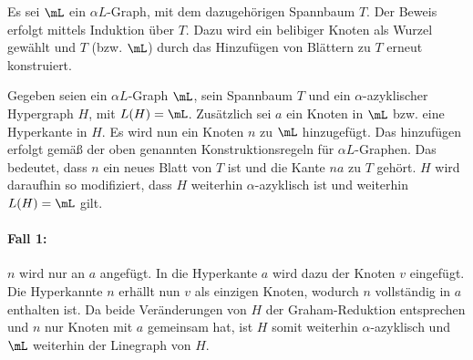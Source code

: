 \begin{Proof}
    Es sei $\mL$ ein $\alpha L$-Graph, mit dem dazugehörigen Spannbaum $T$. Der Beweis erfolgt mittels Induktion über $T$. Dazu wird ein belibiger Knoten als Wurzel gewählt und $T$ (bzw. $\mL$) durch das Hinzufügen von Blättern zu $T$ erneut konstruiert.
    
    Gegeben seien ein $\alpha L$-Graph $\mL$, sein Spannbaum $T$ und ein $\alpha$-azyklischer Hypergraph $H$, mit $L(H)=\mL$. Zusätzlich sei $a$ ein Knoten in $\mL$ bzw. eine Hyperkante in $H$. Es wird nun ein Knoten $n$ zu $\mL$ hinzugefügt. Das hinzufügen erfolgt gemäß der oben genannten Konstruktionsregeln für $\alpha L$-Graphen. Das bedeutet, dass $n$ ein neues Blatt von $T$ ist und die Kante $na$ zu $T$ gehört. $H$ wird daraufhin so modifiziert, dass $H$ weiterhin $\alpha$-azyklisch ist und weiterhin $L(H)=\mL$ gilt.
    
    \paragraph{Fall 1:} $n$ wird nur an $a$ angefügt. In die Hyperkante $a$ wird dazu der Knoten $v$ eingefügt. Die Hyperkannte $n$ erhällt nun $v$ als einzigen Knoten, wodurch $n$ vollständig in $a$ enthalten ist. Da beide Veränderungen von $H$ der Graham-Reduktion entsprechen und $n$ nur Knoten mit $a$ gemeinsam hat, ist $H$ somit weiterhin $\alpha$-azyklisch und $\mL$ weiterhin der Linegraph von $H$.
    

\end{Proof}
